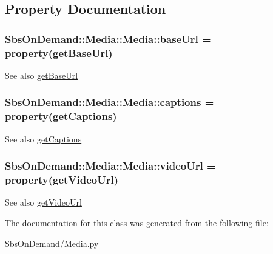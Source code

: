 \subsection{\-Property \-Documentation}
\hypertarget{class_sbs_on_demand_1_1_media_1_1_media_a280143084c1f0b3119833dc01ab0ac1d}{
\subsubsection[{base\-Url}]{\setlength{\rightskip}{0pt plus 5cm}\-Sbs\-On\-Demand\-::\-Media\-::\-Media\-::base\-Url = property(get\-Base\-Url)}}
\label{class_sbs_on_demand_1_1_media_1_1_media_a280143084c1f0b3119833dc01ab0ac1d}
\begin{DoxySeeAlso}{\-See also}
\hyperlink{class_sbs_on_demand_1_1_media_1_1_media_a5fe37abcdbd1b181d7b438beb2fa853e}{get\-Base\-Url} 
\end{DoxySeeAlso}
\hypertarget{class_sbs_on_demand_1_1_media_1_1_media_a1d7bdc5f4e0bd4158cee368c497bd464}{
\subsubsection[{captions}]{\setlength{\rightskip}{0pt plus 5cm}\-Sbs\-On\-Demand\-::\-Media\-::\-Media\-::captions = property(get\-Captions)}}
\label{class_sbs_on_demand_1_1_media_1_1_media_a1d7bdc5f4e0bd4158cee368c497bd464}
\begin{DoxySeeAlso}{\-See also}
\hyperlink{class_sbs_on_demand_1_1_media_1_1_media_abfef7f272342f3eeeb78746725968762}{get\-Captions} 
\end{DoxySeeAlso}
\hypertarget{class_sbs_on_demand_1_1_media_1_1_media_a061419021cfec34bedb43dbaf450d89b}{
\subsubsection[{video\-Url}]{\setlength{\rightskip}{0pt plus 5cm}\-Sbs\-On\-Demand\-::\-Media\-::\-Media\-::video\-Url = property(get\-Video\-Url)}}
\label{class_sbs_on_demand_1_1_media_1_1_media_a061419021cfec34bedb43dbaf450d89b}
\begin{DoxySeeAlso}{\-See also}
\hyperlink{class_sbs_on_demand_1_1_media_1_1_media_a86015bb05666a5def450678728d8f96e}{get\-Video\-Url} 
\end{DoxySeeAlso}


\-The documentation for this class was generated from the following file\-:\begin{DoxyCompactItemize}
\item 
\-Sbs\-On\-Demand/\-Media.\-py\end{DoxyCompactItemize}
